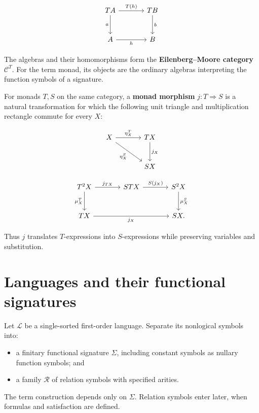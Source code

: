 \documentclass[11pt]{article}
\newcommand{\tightlist}{\setlength{\itemsep}{0pt}%
  \setlength{\parskip}{0pt}}
\begin{document}
\[
\begin{tikzcd}[row sep=large,column sep=large]
T A \arrow[r,"T(h)"] \arrow[d,"a"'] & T B \arrow[d,"b"] \\
A \arrow[r,"h"'] & B
\end{tikzcd}
\]

The algebras and their homomorphisms form the
\textbf{Eilenberg--Moore category} \(\mathcal C^T\). For the term monad, its
objects are the ordinary algebras interpreting the function symbols of a
signature.

For monads \(T,S\) on the same category, a \textbf{monad morphism}
\(j:T\Rightarrow S\) is a natural transformation for which the following
unit triangle and multiplication rectangle commute for every \(X\):

\[
\begin{tikzcd}[row sep=large,column sep=large]
X \arrow[r,"\eta_X^T"] \arrow[dr,"\eta_X^S"'] &
T X \arrow[d,"j_X"] \\
& S X
\end{tikzcd}
\]

\[
\begin{tikzcd}[row sep=large,column sep=large]
T^2X \arrow[r,"j_{T X}"] \arrow[d,"\mu_X^T"'] &
S T X \arrow[r,"S(j_X)"] & S^2X \arrow[d,"\mu_X^S"] \\
T X \arrow[rr,"j_X"'] && S X.
\end{tikzcd}
\]

Thus \(j\) translates \(T\)-expressions into \(S\)-expressions while
preserving variables and substitution.

\section{Languages and their functional
signatures}\label{languages-and-their-functional-signatures}

Let \(\mathcal L\) be a single-sorted first-order language. Separate its
nonlogical symbols into:

\begin{itemize}
\tightlist
\item
  a finitary functional signature \(\Sigma\), including constant symbols
  as nullary function symbols; and
\item
  a family \(\mathcal R\) of relation symbols with specified arities.
\end{itemize}

The term construction depends only on \(\Sigma\). Relation symbols enter
later, when formulas and satisfaction are defined.
\end{document}
